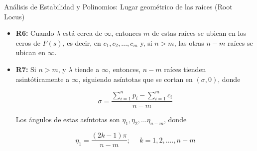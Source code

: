 \documentclass{beamer}
\begin{document}
\begin{frame}{Análisis de Estabilidad y Polinomios: Lugar geométrico de las raíces (Root Locus)}
\begin{justify}

\begin{itemize}

    \justifying
    \item \textbf{R6:} Cuando $\lambda$ está cerca de $\infty$, entonces $m$ de estas raíces se ubican en los ceros de $F(s)$, es decir, en $c_1, c_2,... ,c_m$ y, si $n > m$, las otras $n - m$ raíces se ubican en $\infty$.

    \vspace{0.3cm}
    \item \textbf{R7:} Si $n>m$, y $\lambda$ tiende a $ \infty $, entonces, ${n}-{m}$ raíces tienden asintóticamente a $\infty$, siguiendo asíntotas que se cortan en $(\sigma, 0)$, donde 

    \vspace{0.3cm}
    {\small
    \begin{equation}\label{regla-7}
        \sigma = \frac{\sum_{i=1}^{n} p_i - \sum_{i=1}^{m} c_i}{n-m} 
    \end{equation}
    }

        Los ángulos de estas asíntotas son $\eta_1, \eta_2,...\eta_{n-m}$, donde

    {\small
    \begin{equation}\label{regla-7.1}
        \eta_1 = \frac{(2k-1)\pi}{n-m} ;  \ \ \  \ \ \  k = 1,2,....,n-m
    \end{equation}
    }

\end{itemize}
\end{justify}
\end{frame}
\end{document}

